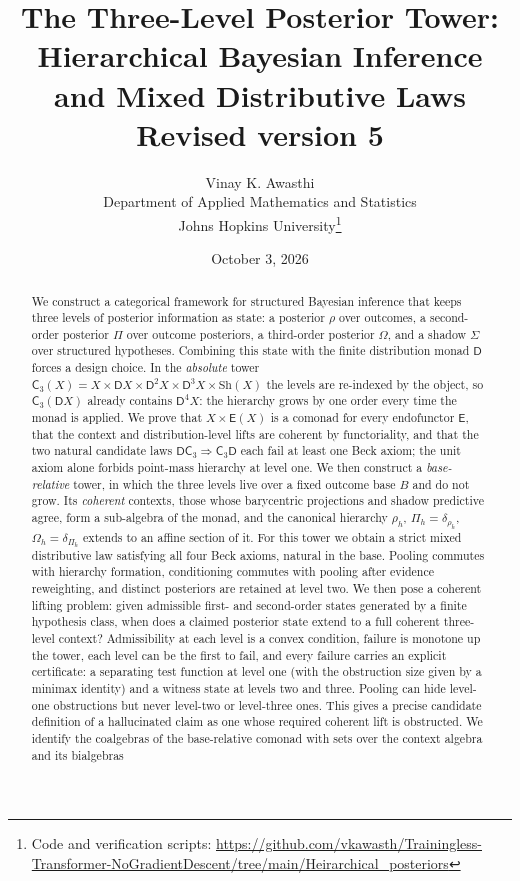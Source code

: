 \documentclass[11pt]{article}
\title{The Three-Level Posterior Tower:\\
Hierarchical Bayesian Inference and Mixed Distributive Laws\\[4pt]
\large Revised version 5}
\author{Vinay K. Awasthi\\
Department of Applied Mathematics and Statistics\\
Johns Hopkins University\thanks{Code and verification scripts:
\url{https://github.com/vkawasth/Trainingless-Transformer-NoGradientDescent/tree/main/Heirarchical_posteriors}}}
\date{October 3, 2026}
\theoremstyle{definition}
\theoremstyle{remark}
\newcommand{\D}{\mathsf{D}}
\newcommand{\Sh}{\mathrm{Sh}}
\newcommand{\C}{\mathsf{C}}
\newcommand{\E}{\mathsf{E}}
\begin{document}
\maketitle

\begin{abstract}
We construct a categorical framework for structured Bayesian inference that keeps three levels of
posterior information as state: a posterior $\rho$ over outcomes, a second-order posterior $\Pi$ over
outcome posteriors, a third-order posterior $\Omega$, and a shadow $\Sigma$ over structured hypotheses.
Combining this state with the finite distribution monad $\D$ forces a design choice. In the
\emph{absolute} tower $\C_3(X)=X\times\D X\times\D^2X\times\D^3X\times\Sh(X)$ the levels are
re-indexed by the object, so $\C_3(\D X)$ already contains $\D^4X$: the hierarchy grows by one order
every time the monad is applied. We prove that $X\times\E(X)$ is a comonad for every endofunctor $\E$,
that the context and distribution-level lifts are coherent by functoriality, and that the two natural
candidate laws $\D\C_3\Rightarrow\C_3\D$ each fail at least one Beck axiom; the unit axiom alone forbids
point-mass hierarchy at level one. We then construct a \emph{base-relative} tower, in which the three
levels live over a fixed outcome base $B$ and do not grow. Its \emph{coherent} contexts, those whose
barycentric projections and shadow predictive agree, form a sub-algebra of the monad, and the
canonical hierarchy $\rho_h$, $\Pi_h=\delta_{\rho_h}$, $\Omega_h=\delta_{\Pi_h}$ extends to an affine
section of it. For this tower we obtain a strict mixed distributive law satisfying all four Beck
axioms, natural in the base. Pooling commutes with hierarchy formation, conditioning commutes with
pooling after evidence reweighting, and distinct posteriors are retained at level two. We then pose a coherent lifting problem: given
admissible first- and second-order states generated by a finite hypothesis class, when does a claimed
posterior state extend to a full coherent three-level context? Admissibility at each level is a
convex condition, failure is monotone up the tower, each level can be the first to fail, and every
failure carries an explicit certificate: a separating test function at level one (with the obstruction
size given by a minimax identity) and a witness state at levels two and three. Pooling can hide
level-one obstructions but never level-two or level-three ones. This gives a precise candidate
definition of a hallucinated claim as one whose required coherent lift is obstructed. We identify
the coalgebras of the base-relative comonad with sets over the context algebra and its bialgebras

\end{abstract}
\end{document}
